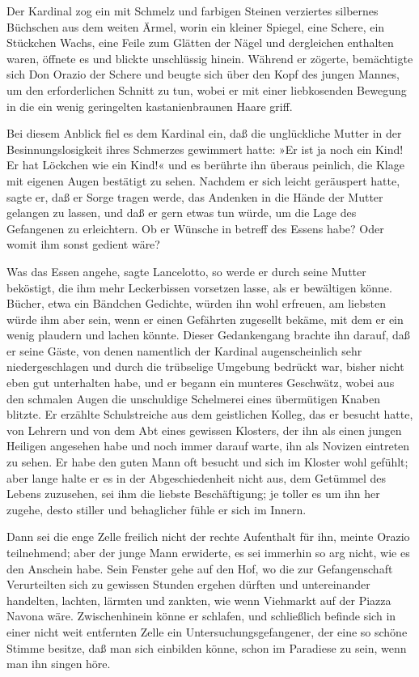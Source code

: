 Der Kardinal zog ein mit Schmelz und farbigen Steinen verziertes
silbernes Büchschen aus dem weiten Ärmel, worin ein kleiner
Spiegel, eine Schere, ein Stückchen Wachs, eine Feile zum Glätten
der Nägel und dergleichen enthalten waren, öffnete es und blickte
unschlüssig hinein. Während er zögerte, bemächtigte sich Don Orazio
der Schere und beugte sich über den Kopf des jungen Mannes, um den
erforderlichen Schnitt zu tun, wobei er mit einer liebkosenden
Bewegung in die ein wenig geringelten kastanienbraunen Haare
griff.

Bei diesem Anblick fiel es dem Kardinal ein, daß die unglückliche
Mutter in der Besinnungslosigkeit ihres Schmerzes gewimmert hatte:
»Er ist ja noch ein Kind! Er hat Löckchen wie ein Kind!« und es
berührte ihn überaus peinlich, die Klage mit eigenen Augen
bestätigt zu sehen. Nachdem er sich leicht geräuspert hatte, sagte
er, daß er Sorge tragen werde, das Andenken in die Hände der Mutter
gelangen zu lassen, und daß er gern etwas tun würde, um die Lage
des Gefangenen zu erleichtern. Ob er Wünsche in betreff des Essens
habe? Oder womit ihm sonst gedient wäre?

Was das Essen angehe, sagte Lancelotto, so werde er durch seine
Mutter beköstigt, die ihm mehr Leckerbissen\pagenum{[62]}
vorsetzen lasse, als er bewältigen könne. Bücher, etwa ein Bändchen
Gedichte, würden ihn wohl erfreuen, am liebsten würde ihm aber
sein, wenn er einen Gefährten zugesellt bekäme, mit dem er ein
wenig plaudern und lachen könnte. Dieser Gedankengang brachte ihn
darauf, daß er seine Gäste, von denen namentlich der Kardinal
augenscheinlich sehr niedergeschlagen und durch die trübselige
Umgebung bedrückt war, bisher nicht eben gut unterhalten habe, und
er begann ein munteres Geschwätz, wobei aus den schmalen Augen die
unschuldige Schelmerei eines übermütigen Knaben blitzte. Er
erzählte Schulstreiche aus dem geistlichen Kolleg, das er besucht
hatte, von Lehrern und von dem Abt eines gewissen Klosters, der ihn
als einen jungen Heiligen angesehen habe und noch immer darauf
warte, ihn als Novizen eintreten zu sehen. Er habe den guten Mann
oft besucht und sich im Kloster wohl gefühlt; aber lange halte er
es in der Abgeschiedenheit nicht aus, dem Getümmel des Lebens
zuzusehen, sei ihm die liebste Beschäftigung; je toller es um ihn
her zugehe, desto stiller und behaglicher fühle er sich im Innern.

Dann sei die enge Zelle freilich nicht der rechte Aufenthalt für
ihn, meinte Orazio teilnehmend; aber der junge Mann erwiderte, es
sei immerhin so arg nicht, wie es den Anschein habe. Sein Fenster
gehe auf den Hof, wo die zur Gefangenschaft Verurteilten sich zu
gewissen Stunden ergehen dürften und untereinander handelten,
lachten, lärmten und zankten, wie wenn Viehmarkt auf der Piazza
Navona wäre. Zwischenhinein könne er schlafen, und schließlich
befinde sich in einer nicht weit entfernten Zelle ein
Untersuchungsgefangener, der eine so schöne Stimme besitze, daß man
sich einbilden könne, schon im Paradiese zu sein, wenn man ihn
singen höre.

